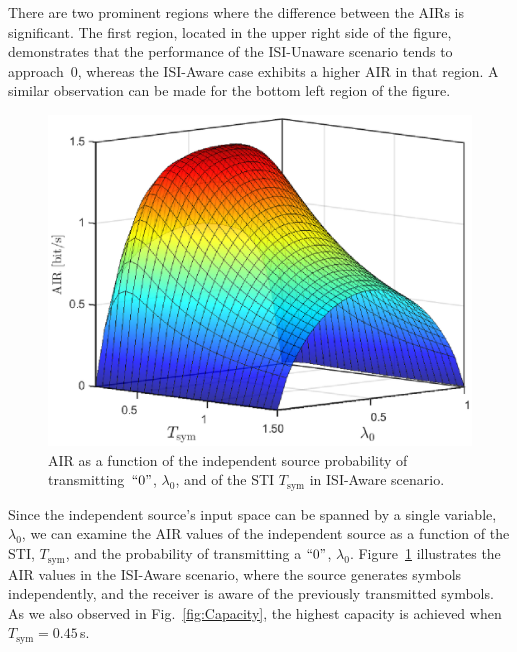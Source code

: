 \documentclass[journal]{IEEEtranTCOM}
\begin{document}
There are two prominent regions where the difference between the AIRs is significant. The first region, located in the upper right side of the figure, demonstrates that the performance of the ISI-Unaware scenario tends to approach~$0$, whereas the ISI-Aware case exhibits a higher AIR in that region. A similar observation can be made for the bottom left region of the figure.
\begin{figure}
    \centering
    \includegraphics[width=1\linewidth]{Figures/AIR_INDP_Aware.eps}
    \caption{AIR as a function of the independent source probability of transmitting~$``0"$, $\lambda_0$, and of the STI $T_{\mathrm{sym}}$ in ISI-Aware scenario.}
    \label{fig:IND_AWARE}
\end{figure}
\par Since the independent source's input space can be spanned by a single variable, $\lambda_{0}$, we can examine the AIR values of the independent source as a function of the STI, $T_{\mathrm{sym}}$, and the probability of transmitting a $``0"$, $\lambda_{0}$. Figure~\ref{fig:IND_AWARE} illustrates the AIR values in the ISI-Aware scenario, where the source generates symbols independently, and the receiver is aware of the previously transmitted symbols. As we also observed in Fig.~\ref{fig:Capacity}, the highest capacity is achieved when $T_{\mathrm{sym}}=0.45$\,s.
\end{document}
